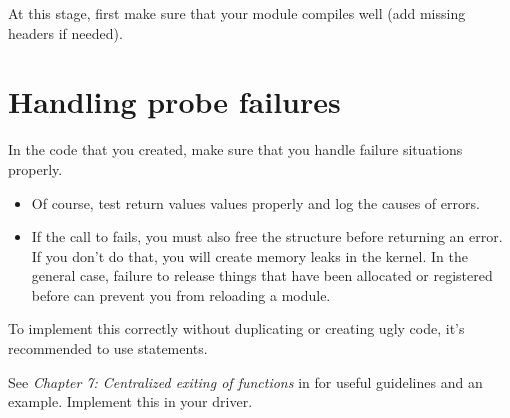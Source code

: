 At this stage, first make sure that your module compiles well (add
missing headers if needed).

\section{Handling probe failures}

In the code that you created, make sure that you handle failure
situations properly.

\begin{itemize}
\item Of course, test return values values properly and log 
      the causes of errors.
\item If the call to  fails,
      you must also free the  structure
      before returning an error. If you don't do that, you will create
      memory leaks in the kernel. In the general case, failure to
      release things that have been allocated or registered before
      can prevent you from reloading a module.
\end{itemize}

To implement this correctly without duplicating or creating ugly code,
it's recommended to use  statements.

See {\em Chapter 7: Centralized exiting of functions} in
 for useful guidelines and an example.
Implement this in your driver. 


